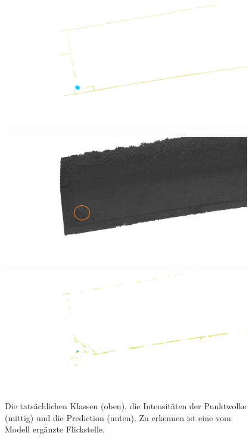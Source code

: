 \begin{figure}
    {\includegraphics[width=0.96\textwidth]{graphics/eval_flickstelle_pothole_ground_truth}}
    \par\smallskip
    {\includegraphics[width=0.96\textwidth]{graphics/eval_flickstelle_pothole_no_classes_circles}}
    \par\smallskip
    {\includegraphics[width=0.96\textwidth]{graphics/eval_flickstelle_pothole_prediction}}
    \caption{Die tatsächlichen Klassen (oben), die Intensitäten der Punktwolke (mittig) und die Prediction (unten). Zu erkennen ist eine vom Modell ergänzte Flickstelle.}
    \label{fig:new_flickstelle}
\end{figure}

